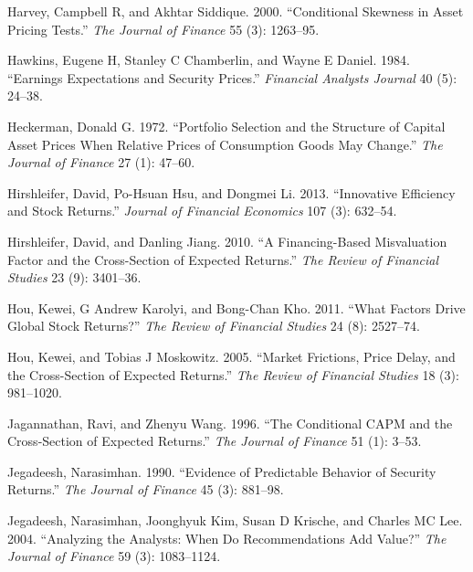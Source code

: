 \documentclass[
  letterpaper,
  DIV=11,
  numbers=noendperiod]{scrreprt}
\newlength{\cslhangindent}
\newlength{\cslentryspacingunit} %
\newenvironment{CSLReferences}[2] %
 {%
  \setlength{\parindent}{0pt}
  \ifodd #1
  \let\oldpar\par
  \def\par{\hangindent=\cslhangindent\oldpar}
  \fi
  \setlength{\parskip}{#2\cslentryspacingunit}
 }%
 {}
\begin{document}
\begin{CSLReferences}{1}{0}
\leavevmode{}%
Harvey, Campbell R, and Akhtar Siddique. 2000. {``Conditional Skewness
in Asset Pricing Tests.''} \emph{The Journal of Finance} 55 (3):
1263--95.

\leavevmode{}%
Hawkins, Eugene H, Stanley C Chamberlin, and Wayne E Daniel. 1984.
{``Earnings Expectations and Security Prices.''} \emph{Financial
Analysts Journal} 40 (5): 24--38.

\leavevmode{}%
Heckerman, Donald G. 1972. {``Portfolio Selection and the Structure of
Capital Asset Prices When Relative Prices of Consumption Goods May
Change.''} \emph{The Journal of Finance} 27 (1): 47--60.

\leavevmode{}%
Hirshleifer, David, Po-Hsuan Hsu, and Dongmei Li. 2013. {``Innovative
Efficiency and Stock Returns.''} \emph{Journal of Financial Economics}
107 (3): 632--54.

\leavevmode{}%
Hirshleifer, David, and Danling Jiang. 2010. {``A Financing-Based
Misvaluation Factor and the Cross-Section of Expected Returns.''}
\emph{The Review of Financial Studies} 23 (9): 3401--36.

\leavevmode{}%
Hou, Kewei, G Andrew Karolyi, and Bong-Chan Kho. 2011. {``What Factors
Drive Global Stock Returns?''} \emph{The Review of Financial Studies} 24
(8): 2527--74.

\leavevmode{}%
Hou, Kewei, and Tobias J Moskowitz. 2005. {``Market Frictions, Price
Delay, and the Cross-Section of Expected Returns.''} \emph{The Review of
Financial Studies} 18 (3): 981--1020.

\leavevmode{}%
Jagannathan, Ravi, and Zhenyu Wang. 1996. {``The Conditional CAPM and
the Cross-Section of Expected Returns.''} \emph{The Journal of Finance}
51 (1): 3--53.

\leavevmode{}%
Jegadeesh, Narasimhan. 1990. {``Evidence of Predictable Behavior of
Security Returns.''} \emph{The Journal of Finance} 45 (3): 881--98.

\leavevmode{}%
Jegadeesh, Narasimhan, Joonghyuk Kim, Susan D Krische, and Charles MC
Lee. 2004. {``Analyzing the Analysts: When Do Recommendations Add
Value?''} \emph{The Journal of Finance} 59 (3): 1083--1124.


\end{CSLReferences}
\end{document}
